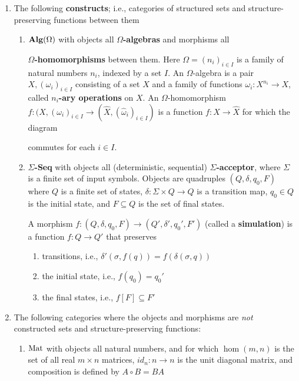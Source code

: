 \documentclass[11pt]{article}
\begin{document}
\begin{examplle}[]
\begin{enumerate}
\item The following \textbf{constructs}; i.e., categories of structured sets and
structure-preserving functions between them
\begin{enumerate}
\item \(\operatorname{\textbf{Alg}}(\Omega)\) with objects all \textbf{\(\Omega\)-algebras} and morphisms all \par
\textbf{\(\Omega\)-homomorphisms} between them. Here \(\Omega=(n_i)_{i\in I}\) is a
family of natural numbers \(n_i\), indexed by a set \(I\). An
\(\Omega\)-algebra is a pair \(X,(\omega_i)_{i\in I}\) consisting of a set
\(X\) and a family of functions \(\omega_i:X^{n_i}\to X\), called \textbf{\(n_i\)-ary
operations} on \(X\). An \(\Omega\)-homomorphism \(f:(X,(\omega_i)_{i\in
         I}\to(\widehat{X},(\widehat{\omega}_i)_{i\in I})\) is a function \(f:X\to\widehat{X}\) for
which the diagram
\begin{center}
\end{center}
commutes for each \(i\in I\).
\item \textbf{\(\Sigma\)-Seq} with objects all (deterministic, sequential)
\textbf{\(\Sigma\)-acceptor}, where \(\Sigma\) is a finite set of input symbols. Objects
are quadruples \((Q,\delta,q_0,F)\) where \(Q\) is a finite set of states, 
\(\delta:\Sigma\times Q\to Q\) is a transition map, \(q_0\in Q\) is the
initial state, and \(F\subseteq Q\) is the set of final states.

A morphism \(f:(Q,\delta,q_0,F)\to(Q',\delta',q_0',F')\) (called a
\textbf{simulation}) is a function \(f:Q\to Q'\) that preserves
\begin{enumerate}
\item transitions, i.e., \(\delta'(\sigma,f(q))=f(\delta(\sigma,q))\)
\item the initial state, i.e., \(f(q_0)=q_0'\)
\item the final states, i.e., \(f[F]\subseteq F'\)
\end{enumerate}
\end{enumerate}
\item The following categories where the objects and morphisms are \emph{not}
constructed sets and structure-preserving functions:
\begin{enumerate}
\item \(\operatorname{Mat}\) with objects all natural numbers, and for which \(\hom(m,n)\) is
the set of all real \(m\times n\) matrices, \(id_n:n\to n\) is the unit
diagonal matrix, and composition is defined by \(A\circ B=BA\)


\end{enumerate}
\end{enumerate}
\end{examplle}
\end{document}
